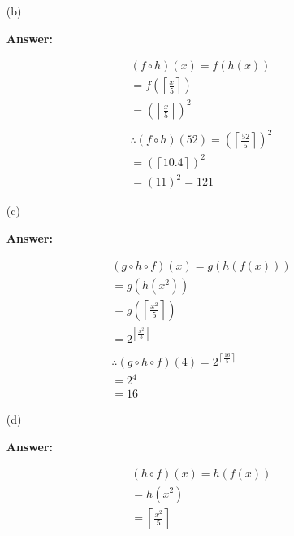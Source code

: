 \documentclass[14pt]{extreport}
\newcommand{\answer}[0]{\medskip \textbf{Answer:} \medskip}
\begin{document}
\begin{enumerate}

    \item[(b)]
    
        \answer

        \begin{align*}
            \left ( f \circ h \right )\left ( x \right ) = f\left ( h\left ( x \right ) \right ) \\
            = f\left (  \left \lceil \frac{x}{5} \right \rceil \right ) \\
            = \left (  \left \lceil \frac{x}{5} \right \rceil \right )^{2} \\\\
            \therefore \left ( f \circ h \right )\left ( 52 \right ) = \left (  \left \lceil \frac{52}{5} \right \rceil \right )^{2} \\
            = \left ( \left \lceil 10.4 \right \rceil \right )^{2} \\
            = \left ( 11 \right )^{2} = 121
        \end{align*}

    \item[(c)]
    
        \answer

        \begin{align*}
            \left ( g \circ h \circ f \right )\left ( x \right ) = g\left ( h\left ( f\left ( x \right ) \right ) \right ) \\
            = g\left ( h\left ( x^{2} \right ) \right ) \\
            = g\left (  \left \lceil \frac{x^2}{5} \right \rceil \right ) \\
            = 2^{\left \lceil \frac{x^2}{5} \right \rceil} \\\\
            \therefore \left ( g \circ h \circ f \right )\left ( 4 \right ) = 2^{\left \lceil \frac{16}{5} \right \rceil} \\
            = 2^{4} \\
            = 16
        \end{align*}

    \item[(d)]
    
        \answer

        \begin{align*}
            \left ( h \circ f \right )\left ( x \right ) = h\left ( f\left ( x \right ) \right ) \\
            = h\left ( x^{2} \right ) \\
            = \left \lceil \frac{x^{2}}{5} \right \rceil
        \end{align*}

\end{enumerate}
\newpage
\end{document}
